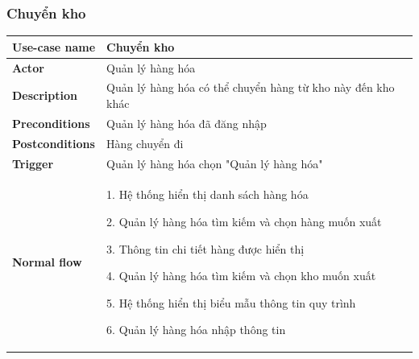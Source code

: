         \subsubsection{Chuyển kho}
            \begin{longtable}{| p{} | p{} |} 
                \hline
                    \textbf{Use-case name} 
                & 
                    Chuyển kho
                \\
                \hline
                    \textbf{Actor} 
                & 
                    Quản lý hàng hóa
                \\
                \hline
                    \textbf{Description} 
                & 
                    Quản lý hàng hóa có thể chuyển hàng từ kho này đến kho khác
                \\
                \hline
                    \textbf{Preconditions} 
                &
                    Quản lý hàng hóa đã đăng nhập
                \\
                \hline
                    \textbf{Postconditions} 
                & 
                    Hàng chuyển đi
                \\
                \hline
                    \textbf{Trigger} 
                & 
                    Quản lý hàng hóa chọn "Quản lý hàng hóa"
                \\
                \hline
                \begin{flushleft}
                    \textbf{Normal flow}
                \end{flushleft}
                & 
                1. Hệ thống hiển thị danh sách hàng hóa
                    
                    2. Quản lý hàng hóa tìm kiếm và chọn hàng muốn xuất
                    
                    3. Thông tin chi tiết hàng được hiển thị
                    
                    4. Quản lý hàng hóa tìm kiếm và chọn kho muốn xuất
                    
                    5. Hệ thống hiển thị biểu mẫu thông tin quy trình
                    
                    6. Quản lý hàng hóa nhập thông tin
                    

\end{longtable}
